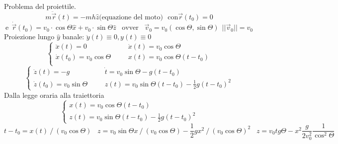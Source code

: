 \begin{example}
    Problema del proiettile.
    $$m\ddot{\vec{r}}(t) = -mh\hat{z} \text{(equazione del moto)}\:\:\: \text{con}\vec{r}(t_0) = 0$$
    $$\text{e}\:\: \dot{\vec{r}}(t_0) = v_0 \cdot \cos\Theta\hat{x} + v_0 \cdot \sin\Theta\hat{z} \hspace{10pt}\text{ovver}\hspace{10pt}\vec{v}_0 = v_0(\cos\Theta, \sin\Theta) \:\: ||\vec{v}_0|| = v_0$$
    Proiezione lungo $\hat{y}$ banale: $\ddot{y}(t) \equiv 0, y(t) \equiv 0$
    $$
    \begin{cases}
        \ddot{x}(t) = 0& \hspace{20pt} \dot{x}(t) = v_0 \cos\Theta \\
        \dot{x}(t_0) = v_0 \cos\Theta & \hspace{20pt} x(t) = v_0\cos\Theta (t-t_0)\\
    \end{cases}
    $$
    $$
    \begin{cases}
        \ddot{z}(t) = -g & \hspace{20pt} \dot{t} = v_0 \sin\Theta - g(t - t_0)\\
        \dot{z}(t_0) = v_0 \sin\Theta & \hspace{20pt} z(t) = v_0\sin\Theta(t - t_0) - \frac{1}{2}g (t - t_0)^2
    \end{cases}
    $$
    Dalla legge oraria alla traiettoria
    $$
    \begin{cases}
        x(t) = v_0 \cos\Theta(t - t_0)\\
        z(t) = v_0\sin\Theta(t - t_0) - \frac{1}{2}g(t - t_0)^2
    \end{cases}
    $$
    $$t - t_0 = x(t) \: / \: (v_0\cos\Theta) \hspace{10pt} z = v_0\sin\Theta x\: / \: (v_0 \cos\Theta) - \frac{1}{2}g x^2 \: / \: (v_0\cos\Theta)^2 \hspace{10pt} z=v_0 tg\Theta - x^2 \frac{g}{2v_0^2}\frac{1}{\cos^2\Theta}$$
    \begin{observation}
    \end{observation}
\end{example}

